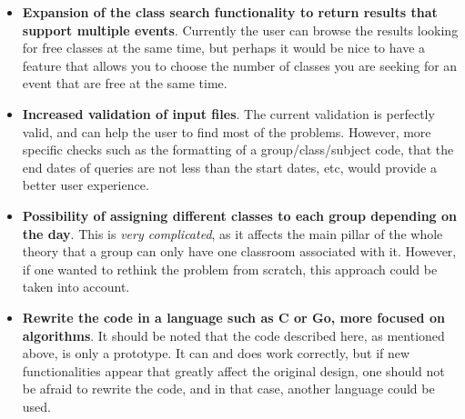 \begin{itemize}
    \item \textbf{Expansion of the class search functionality to return results that support multiple events}. Currently the user can browse the results looking for free classes at the same time, but perhaps it would be nice to have a feature that allows you to choose the number of classes you are seeking for an event that are free at the same time.
    \item \textbf{Increased validation of input files}. The current validation is perfectly valid, and can help the user to find most of the problems. However, more specific checks such as the formatting of a group/class/subject code, that the end dates of queries are not less than the start dates, etc, would provide a better user experience.
    \item \textbf{Possibility of assigning different classes to each group depending on the day}. This is \textit{very complicated}, as it affects the main pillar of the whole theory that a group can only have one classroom associated with it. However, if one wanted to rethink the problem from scratch, this approach could be taken into account.
    \item \textbf{Rewrite the code in a language such as C or Go, more focused on algorithms}. It should be noted that the code described here, as mentioned above, is only a prototype. It can and does work correctly, but if new functionalities appear that greatly affect the original design, one should not be afraid to rewrite the code, and in that case, another language could be used.
\end{itemize}


